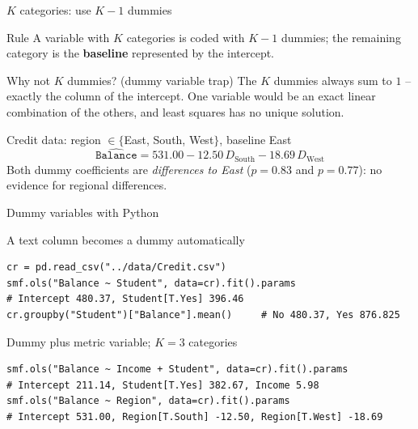 \documentclass[aspectratio=169,11pt]{beamer}
\begin{document}
\begin{frame}{$K$ categories: use $K-1$ dummies}
  \begin{block}{Rule}
    A variable with $K$ categories is coded with $K-1$ dummies; the
    remaining category is the \textbf{baseline} represented by the intercept.
  \end{block}
  \begin{alertblock}{Why not $K$ dummies? (dummy variable trap)}
    The $K$ dummies always sum to $1$ -- exactly the column of the
    intercept. One variable would be an exact linear combination of the
    others, and least squares has no unique solution.
  \end{alertblock}
  \begin{exampleblock}{Credit data: region $\in\{$East, South, West$\}$, baseline East}
    \[
      \widehat{\texttt{Balance}}=531.00-12.50\,D_{\text{South}}-18.69\,D_{\text{West}}
    \]
    Both dummy coefficients are \emph{differences to East}
    ($p=0.83$ and $p=0.77$): no evidence for regional differences.
  \end{exampleblock}
\end{frame}

\begin{frame}[fragile]{Dummy variables with Python}
  \vspace{-4pt}
  \begin{block}{A text column becomes a dummy automatically}
\begin{lstlisting}
cr = pd.read_csv("../data/Credit.csv")
smf.ols("Balance ~ Student", data=cr).fit().params
# Intercept 480.37, Student[T.Yes] 396.46
cr.groupby("Student")["Balance"].mean()     # No 480.37, Yes 876.825
\end{lstlisting}
  \end{block}
  \begin{block}{Dummy plus metric variable; $K = 3$ categories}
\begin{lstlisting}
smf.ols("Balance ~ Income + Student", data=cr).fit().params
# Intercept 211.14, Student[T.Yes] 382.67, Income 5.98
smf.ols("Balance ~ Region", data=cr).fit().params
# Intercept 531.00, Region[T.South] -12.50, Region[T.West] -18.69
\end{lstlisting}
  \end{block}
\end{frame}
\end{document}
